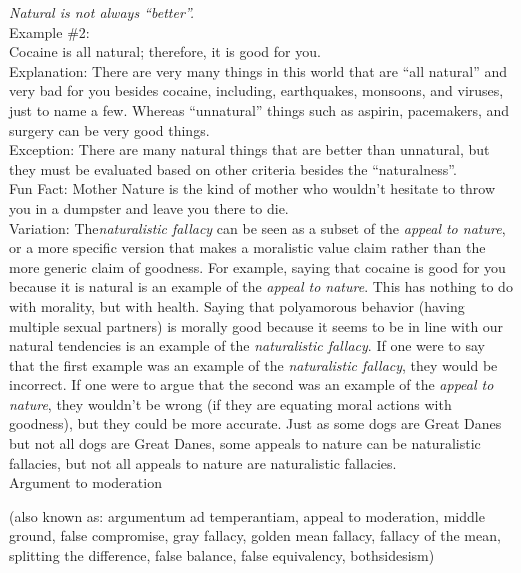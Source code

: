 \documentclass[a4paper,12pt,single,pdftex]{scrartcl}
\begin{document}
      
        {\it Natural is not always “better”.}
      \\

      
        Example \#2:
      \\

      
        Cocaine is all natural; therefore, it is good for you.
      \\

      
        Explanation: There are very many things in this world that are “all natural” and very bad for you besides cocaine, including, earthquakes, monsoons, and viruses, just to name a few.  Whereas “unnatural” things such as aspirin, pacemakers, and surgery can be very good things.
      \\

      
        Exception: There are many natural things that are better than unnatural, but they must be evaluated based on other criteria besides the “naturalness”.
      \\

      
        Fun Fact: Mother Nature is the kind of mother who wouldn’t hesitate to throw you in a dumpster and leave you there to die.
      \\

      
        Variation: The{\it  naturalistic fallacy} can be seen as a subset of the {\it appeal to nature}, or a more specific version that makes a moralistic value claim rather than the more generic claim of goodness. For example, saying that cocaine is good for you because it is natural is an example of the {\it appeal to nature}. This has nothing to do with morality, but with health. Saying that polyamorous behavior (having multiple sexual partners) is morally good because it seems to be in line with our natural tendencies is an example of the {\it naturalistic fallacy}. If one were to say that the first example was an example of the {\it naturalistic fallacy}, they would be incorrect. If one were to argue that the second was an example of the {\it appeal to nature}, they wouldn't be wrong (if they are equating moral actions with goodness), but they could be more accurate. Just as some dogs are Great Danes but not all dogs are Great Danes, some appeals to nature can be naturalistic fallacies, but not all appeals to nature are naturalistic fallacies.
      \\

    
  

Argument to moderation
    
      (also known as: argumentum ad temperantiam, appeal to moderation, middle ground, false compromise, gray fallacy, golden mean fallacy, fallacy of the mean, splitting the difference, false balance, false equivalency, bothsidesism)
    \\
\end{document}
